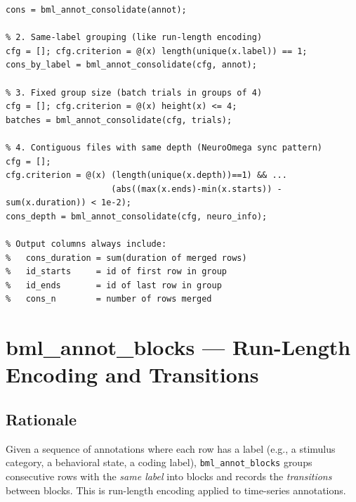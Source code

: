 \documentclass[11pt, a4paper]{article}
\begin{document}
\begin{lstlisting}[style=matlab]
% 1. Default criterion: merge overlapping/touching (same as bml_annot_union)
cons = bml_annot_consolidate(annot);

% 2. Same-label grouping (like run-length encoding)
cfg = []; cfg.criterion = @(x) length(unique(x.label)) == 1;
cons_by_label = bml_annot_consolidate(cfg, annot);

% 3. Fixed group size (batch trials in groups of 4)
cfg = []; cfg.criterion = @(x) height(x) <= 4;
batches = bml_annot_consolidate(cfg, trials);

% 4. Contiguous files with same depth (NeuroOmega sync pattern)
cfg = [];
cfg.criterion = @(x) (length(unique(x.depth))==1) && ...
                     (abs((max(x.ends)-min(x.starts)) - sum(x.duration)) < 1e-2);
cons_depth = bml_annot_consolidate(cfg, neuro_info);

% Output columns always include:
%   cons_duration = sum(duration of merged rows)
%   id_starts     = id of first row in group
%   id_ends       = id of last row in group
%   cons_n        = number of rows merged
\end{lstlisting}

\section{bml\_annot\_blocks --- Run-Length Encoding and Transitions}
\label{sec:blocks}

\subsection{Rationale}

Given a sequence of annotations where each row has a label (e.g., a stimulus category, a behavioral state, a coding label), \texttt{bml\_annot\_blocks} groups consecutive rows with the \emph{same label} into blocks and records the \emph{transitions} between blocks. This is run-length encoding applied to time-series annotations.
\end{document}

